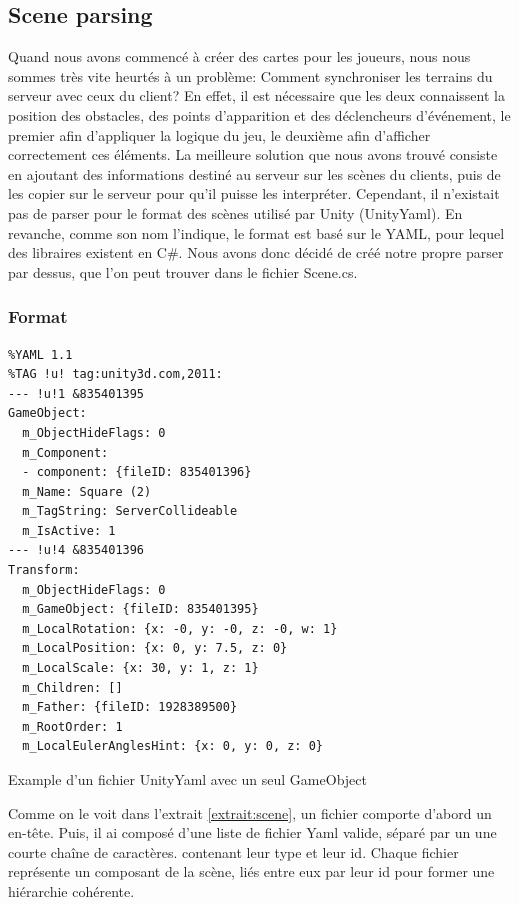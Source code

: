 \documentclass[a4paper]{article}
\begin{document}
\subsection{Scene parsing}
Quand nous avons commencé à créer des cartes pour les joueurs, nous nous sommes très vite heurtés à un problème: Comment synchroniser les terrains du serveur avec ceux du client? En effet, il est nécessaire que les deux connaissent la position des obstacles, des points d'apparition et des déclencheurs d'événement, le premier afin d'appliquer la logique du jeu, le deuxième afin d'afficher correctement ces éléments. La meilleure solution que nous avons trouvé consiste en ajoutant des informations destiné au serveur sur les scènes du clients, puis de les copier sur le serveur pour qu'il puisse les interpréter. Cependant, il n'existait pas de parser\cite{parser} pour le format des scènes utilisé par Unity (UnityYaml\cite{unityyaml}). En revanche, comme son nom l'indique, le format est basé sur le YAML\cite{yaml}, pour lequel des libraires existent en C\#. Nous avons donc décidé de créé notre propre parser par dessus, que l'on peut trouver dans le fichier Scene.cs.

\subsubsection{Format}
\begin{listing}[!h]
\begin{verbatim}
%YAML 1.1
%TAG !u! tag:unity3d.com,2011:
--- !u!1 &835401395
GameObject:
  m_ObjectHideFlags: 0
  m_Component:
  - component: {fileID: 835401396}
  m_Name: Square (2)
  m_TagString: ServerCollideable
  m_IsActive: 1
--- !u!4 &835401396
Transform:
  m_ObjectHideFlags: 0
  m_GameObject: {fileID: 835401395}
  m_LocalRotation: {x: -0, y: -0, z: -0, w: 1}
  m_LocalPosition: {x: 0, y: 7.5, z: 0}
  m_LocalScale: {x: 30, y: 1, z: 1}
  m_Children: []
  m_Father: {fileID: 1928389500}
  m_RootOrder: 1
  m_LocalEulerAnglesHint: {x: 0, y: 0, z: 0}
\end{verbatim}
\caption{Example d'un fichier UnityYaml avec un seul GameObject}
\label{extrait:scene}
\end{listing}
Comme on le voit dans l'extrait \ref{extrait:scene}, un fichier comporte d'abord un en-tête. Puis, il ai composé d'une liste de fichier Yaml valide, séparé par un une courte chaîne de caractères. contenant leur type et leur id. Chaque fichier représente un composant de la scène, liés entre eux par leur id pour former une hiérarchie cohérente. 
\end{document}
